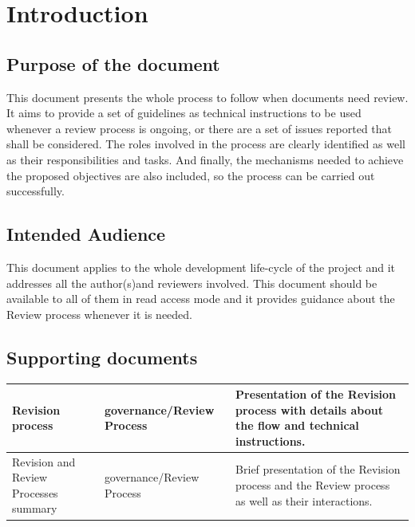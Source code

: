 \documentclass{template/openetcs_article}
\begin{document}
\newpage

\section{Introduction}

\subsection[Introduction]{Purpose of the document}
This document presents the whole process to follow when documents need review. It aims to provide a set of guidelines as technical instructions to be used whenever a review process is ongoing, or there are a set of issues reported that shall be considered. The roles involved in the process are clearly identified as well as their responsibilities and tasks. And finally, the mechanisms needed to achieve the proposed objectives are also included, so the process can be carried out successfully.

\subsection{Intended Audience}
This document applies to the whole development life-cycle of the project and it addresses all the author(s)and reviewers involved. This document should be available to all of them in read access mode and it provides guidance about the Review process whenever it is needed. 

\subsection{Supporting documents}
\tablehead{}
\tabletail{}
\tablelasttail{}
\begin{supertabular}{|m{2cm}m{3cm}m{9cm}|}
\hline
Revision process &
governance/Review Process &
Presentation of the Revision process with details about the flow and technical instructions.
\\\hline
Revision and Review Processes summary &
governance/Review Process &
Brief presentation of the Revision process and the Review process as well as their interactions.
\\\hline
\end{supertabular}
\end{document}
